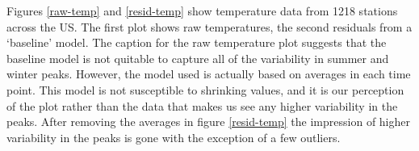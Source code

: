 \documentclass[11pt]{article}\usepackage{graphicx, color}
\begin{document}
Figures \ref{raw-temp} and \ref{resid-temp} show temperature data from 1218 stations across the US. The first plot shows raw temperatures, the second residuals from a `baseline' model. The caption for the raw temperature plot suggests that the baseline model is not quitable to capture all of the variability in summer and winter peaks. However, the model used is actually based on averages in each time point. This model is not  susceptible to shrinking values, and it is our perception of the plot rather than the data that makes us see any higher variability in the peaks. After removing the averages in figure \ref{resid-temp} the impression of higher variability in the peaks is gone with the exception of a few outliers.



\end{document}
